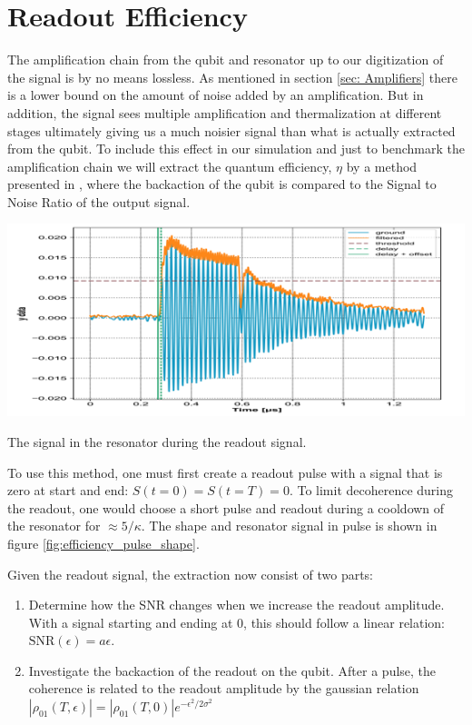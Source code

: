 \section{Readout Efficiency}
The amplification chain from the qubit and resonator up to our digitization of the signal is by no means lossless. As mentioned in section \ref{sec: Amplifiers} there is a lower bound on the amount of noise added by an amplification. But in addition, the signal sees multiple amplification and thermalization at different stages ultimately giving us a much noisier signal than what is actually extracted from the qubit. To include this effect in our simulation and just to benchmark the amplification chain we will extract the quantum efficiency, $\eta$ by a method presented in \cite{bultink}, where the backaction of the qubit is compared to the Signal to Noise Ratio of the output signal. 

\begin{marginfigure}
    \centering
    \includegraphics{Figs/calibrations/efficiency/pulse_shape.png}
    \caption{The signal in the resonator during the readout signal.}
    \label{fig:efficiency_pulse_shape}
\end{marginfigure}

To use this method, one must first create a readout pulse with a signal that is zero at start and end: $S(t = 0) = S(t = T) = 0$. To limit decoherence during the readout, one would choose a short pulse and readout during a cooldown of the resonator for $\approx 5 / \kappa$. The shape and resonator signal in pulse is shown in figure \ref{fig:efficiency_pulse_shape}. 

Given the readout signal, the extraction now consist of two parts:
\begin{enumerate}
    \item Determine how the SNR changes when we increase the readout amplitude. With a signal starting and ending at 0, this should follow a linear relation: $\text{SNR}(\epsilon) = a \epsilon$.
    \item Investigate the backaction of the readout on the qubit. After a pulse, the coherence is related to the readout amplitude by the gaussian relation $|\rho_{01}(T, \epsilon)| = |\rho_{01}(T, 0)|e^{-\epsilon^2/2\sigma^2}$
\end{enumerate}

